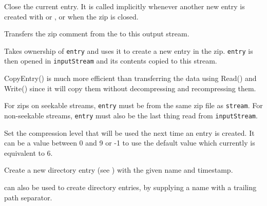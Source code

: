
Close the current entry. It is called implicitly whenever another new
entry is created with 
or , or
when the zip is closed.


\label{wxzipoutputstreamcopyarchivemetadata}


Transfers the zip comment from the 
to this output stream.


\label{wxzipoutputstreamcopyentry}


Takes ownership of {\tt entry} and uses it to create a new entry
in the zip. {\tt entry} is then opened in {\tt inputStream} and its contents
copied to this stream.

CopyEntry() is much more efficient than transferring the data using
Read() and Write() since it will copy them without decompressing and
recompressing them.

For zips on seekable streams, {\tt entry} must be from the same zip file
as {\tt stream}. For non-seekable streams, {\tt entry} must also be the
last thing read from {\tt inputStream}.


\label{wxzipoutputstreamlevel}



Set the compression level that will be used the next time an entry is
created. It can be a value between 0 and 9 or -1 to use the default value
which currently is equivalent to 6.


\label{wxzipoutputstreamputnextdirentry}


Create a new directory entry
(see )
with the given name and timestamp.

 can
also be used to create directory entries, by supplying a name with
a trailing path separator.



